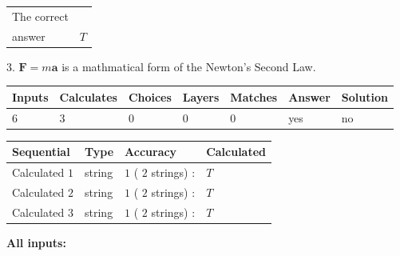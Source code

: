 \documentclass[12pt]{article}
\begin{document}
\noindent\begin{tabular}{|l|l|}\hline The correct & \\
          answer &  %
$T$ \\ \hline \end{tabular}
3.  %
$\mathbf{F}=m\mathbf{a}$ is a mathmatical form of  %
the Newton's Second Law.
 
 
 
\noindent{}
 
 

 
\vspace{0.3in}
   
   
   
   
\noindent\begin{tabular}{|l|l|l|l|l|l|l|}
 \hline
Inputs & Calculates & Choices & Layers & Matches & Answer & Solution \\ \hline
           6 & 
           3 & 
           0
  & 
           0 & 
           0 & 
  yes & 
  no 
  \\ \hline
 \end{tabular}
   
   
   
   
\noindent{}
   
   
  
  
\noindent\begin{tabular}{|l|l|l|l|}
\hline
 Sequential & Type & Accuracy & Calculated \\ 
\hline
 
 
  Calculated $           1$ & string & $           1 $ ( $          2 $ strings)
 : 
 & $T$
 \\  \hline  
 
 
  Calculated $           2$ & string & $           1 $ ( $          2 $ strings)
 : 
 & $T$
 \\  \hline  
 
 
  Calculated $           3$ & string & $           1 $ ( $          2 $ strings)
 : 
 & $T$
 \\  \hline  
 \end{tabular}
   
   
   
   
\noindent\vspace{0.1in}\hspace{-0.08in} {\textbf{\Large{All inputs: }}}
   
\end{document}

